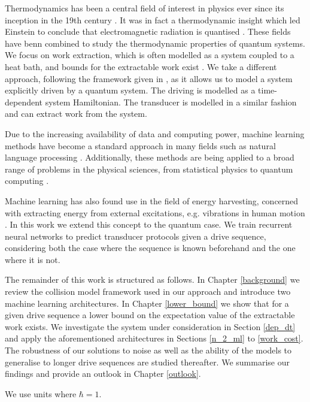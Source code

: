 Thermodynamics has been a central field of interest in physics ever since its inception in the 19th century \cite{thomson_2011}.
It was in fact a thermodynamic insight which led Einstein to conclude that electromagnetic radiation is quantised \cite{1905AnP...322..132E}.
These fields have benn combined to study the thermodynamic properties of quantum systems.
We focus on work extraction, which is often modelled as a system coupled to a heat bath, and bounds for the extractable work exist \cite{Egloff_2015}.
We take a different approach, following the framework given in \cite{beyer2020}, as it allows us to model a system explicitly driven by a quantum system.
The driving is modelled as a time-dependent system Hamiltonian.
The transducer is modelled in a similar fashion and can extract work from the system.

Due to the increasing availability of data and computing power, machine learning methods have become a standard approach in many fields such as natural language processing \cite{DBLP:journals/corr/VaswaniSPUJGKP17}.
Additionally, these methods are being applied to a broad range of problems in the physical sciences, from statistical physics to quantum computing \cite{Carleo_2019, wise2021using}.

Machine learning has also found use in the field of energy harvesting, concerned with extracting energy from external excitations, e.g. vibrations in human motion \cite{Liu2019}.
In this work we extend this concept to the quantum case.
We train recurrent neural networks to predict transducer protocols given a drive sequence, considering both the case where the sequence is known beforehand and the one where it is not.

The remainder of this work is structured as follows.
In Chapter \ref{background} we review the collision model framework used in our approach and introduce two machine learning architectures.
In Chapter \ref{lower_bound} we show that for a given drive sequence a lower bound on the expectation value of the extractable work exists.
We investigate the system under consideration in Section \ref{dep_dt} and apply the aforementioned architectures in Sections \ref{n_2_ml} to \ref{work_cost}.
The robustness of our solutions to noise as well as the ability of the models to generalise to longer drive sequences are studied thereafter.
We summarise our findings and provide an outlook in Chapter \ref{outlook}.

We use units where $\hbar = 1$.